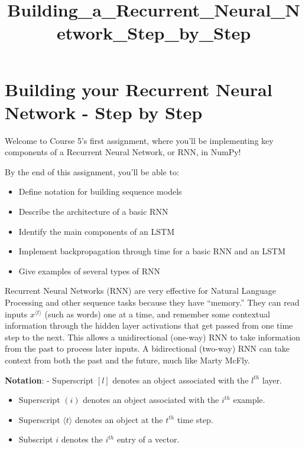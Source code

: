 \documentclass[11pt]{article}
\title{Building\_a\_Recurrent\_Neural\_Network\_Step\_by\_Step}
\providecommand{\tightlist}{%
      \setlength{\itemsep}{0pt}\setlength{\parskip}{0pt}}
\begin{document}
    
    \maketitle
    
    

    
    \hypertarget{building-your-recurrent-neural-network---step-by-step}{%
\section{Building your Recurrent Neural Network - Step by
Step}\label{building-your-recurrent-neural-network---step-by-step}}

Welcome to Course 5's first assignment, where you'll be implementing key
components of a Recurrent Neural Network, or RNN, in NumPy!

By the end of this assignment, you'll be able to:

\begin{itemize}
\tightlist
\item
  Define notation for building sequence models
\item
  Describe the architecture of a basic RNN
\item
  Identify the main components of an LSTM
\item
  Implement backpropagation through time for a basic RNN and an LSTM
\item
  Give examples of several types of RNN
\end{itemize}

Recurrent Neural Networks (RNN) are very effective for Natural Language
Processing and other sequence tasks because they have ``memory.'' They
can read inputs \(x^{\langle t \rangle}\) (such as words) one at a time,
and remember some contextual information through the hidden layer
activations that get passed from one time step to the next. This allows
a unidirectional (one-way) RNN to take information from the past to
process later inputs. A bidirectional (two-way) RNN can take context
from both the past and the future, much like Marty McFly.

\textbf{Notation}: - Superscript \([l]\) denotes an object associated
with the \(l^{th}\) layer.

\begin{itemize}
\item
  Superscript \((i)\) denotes an object associated with the \(i^{th}\)
  example.
\item
  Superscript \(\langle t \rangle\) denotes an object at the \(t^{th}\)
  time step.
\item
  Subscript \(i\) denotes the \(i^{th}\) entry of a vector.
\end{itemize}
\end{document}
